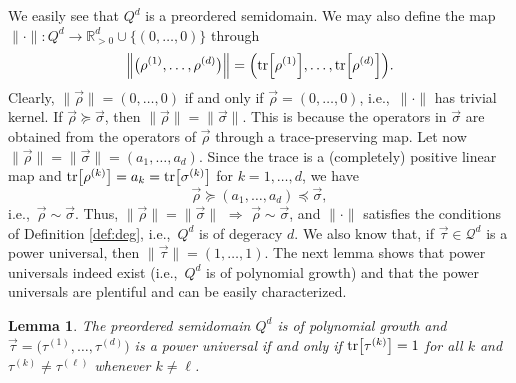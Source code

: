 \documentclass[12pt,a4paper,reqno]{amsart}
\newtheorem{lemma}[proposition]{Lemma}
\theoremstyle{definition}
\newcommand{\mc}[1]{\mathcal{#1}}
\newcommand{\R}{\mathbb R}
\newcommand{\tr}[1]{\mathrm{tr}\left[#1\right]} %
\let\originalleft\left
\let\originalright\right
\renewcommand{\left}{\mathopen{}\mathclose\bgroup\originalleft}
\renewcommand{\right}{\aftergroup\egroup\originalright}
\begin{document}
We easily see that $Q^d$ is a preordered semidomain. We may also define the map $\|\cdot\|:Q^d\to\R_{>0}^d\cup\{(0,\ldots,0)\}$ through
$$
\left\|\big(\rho^{(1)},\ldots,\rho^{(d)}\big)\right\|=\left(\tr{\rho^{(1)}},\ldots,\tr{\rho^{(d)}}\right).
$$
Clearly, $\|\vec{\rho}\|=(0,\ldots,0)$ if and only if $\vec{\rho}=(0,\ldots,0)$, i.e.,\ $\|\cdot\|$ has trivial kernel. If $\vec{\rho}\succeq\vec{\sigma}$, then $\|\vec{\rho}\|=\|\vec{\sigma}\|$. This is because the operators in $\vec{\sigma}$ are obtained from the operators of $\vec{\rho}$ through a trace-preserving map. Let now $\|\vec{\rho}\|=\|\vec{\sigma}\|=(a_1,\ldots,a_d)$. Since the trace is a (completely) positive linear map and $\tr{\rho^{(k)}}=a_k=\tr{\sigma^{(k)}}$ for $k=1,\ldots,d$, we have
$$
\vec{\rho}\succeq(a_1,\ldots,a_d)\preceq\vec{\sigma},
$$
i.e.,\ $\vec{\rho}\sim\vec{\sigma}$. Thus, $\|\vec{\rho}\|=\|\vec{\sigma}\|$ $\Rightarrow$ $\vec{\rho}\sim\vec{\sigma}$, and $\|\cdot\|$ satisfies the conditions of Definition \ref{def:deg}, i.e.,\ $Q^d$ is of degeracy $d$. We also know that, if $\vec{\tau}\in\mc Q^d$ is a power universal, then $\|\vec{\tau}\|=(1,\ldots,1)$. The next lemma shows that power universals indeed exist (i.e.,\ $Q^d$ is of polynomial growth) and that the power universals are plentiful and can be easily characterized.

\begin{lemma}\label{lemma:Quniversal}
The preordered semidomain $Q^d$ is of polynomial growth and $\vec{\tau}=\big(\tau^{(1)},\ldots,\tau^{(d)}\big)$ is a power universal if and only if $\tr{\tau^{(k)}}=1$ for all $k$ and $\tau^{(k)}\neq\tau^{(\ell)}$ whenever $k\neq\ell$.
\end{lemma}
\end{document}
